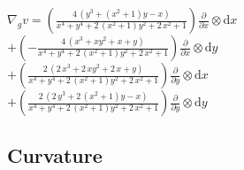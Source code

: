 \begin{NBout}
$\displaystyle
\nabla_{g} v = \left( \frac{4 \, {\left(y^{3} + {\left(x^{2} + 1\right)} y - x\right)}}{x^{4} + y^{4} + 2 \, {\left(x^{2} + 1\right)} y^{2} + 2 \, x^{2} + 1} \right) \frac{\partial}{\partial x }\otimes \mathrm{d} x $\\
$\displaystyle
+ \left( -\frac{4 \, {\left(x^{3} + x y^{2} + x + y\right)}}{x^{4} + y^{4} + 2 \, {\left(x^{2} + 1\right)} y^{2} + 2 \, x^{2} + 1} \right) \frac{\partial}{\partial x }\otimes \mathrm{d} y $\\
$\displaystyle
+ \left( \frac{2 \, {\left(2 \, x^{3} + 2 \, x y^{2} + 2 \, x + y\right)}}{x^{4} + y^{4} + 2 \, {\left(x^{2} + 1\right)} y^{2} + 2 \, x^{2} + 1} \right) \frac{\partial}{\partial y }\otimes \mathrm{d} x$\\
$\displaystyle
 + \left( \frac{2 \, {\left(2 \, y^{3} + 2 \, {\left(x^{2} + 1\right)} y - x\right)}}{x^{4} + y^{4} + 2 \, {\left(x^{2} + 1\right)} y^{2} + 2 \, x^{2} + 1} \right) \frac{\partial}{\partial y }\otimes \mathrm{d} y$
\end{NBout}

\subsection{Curvature}

